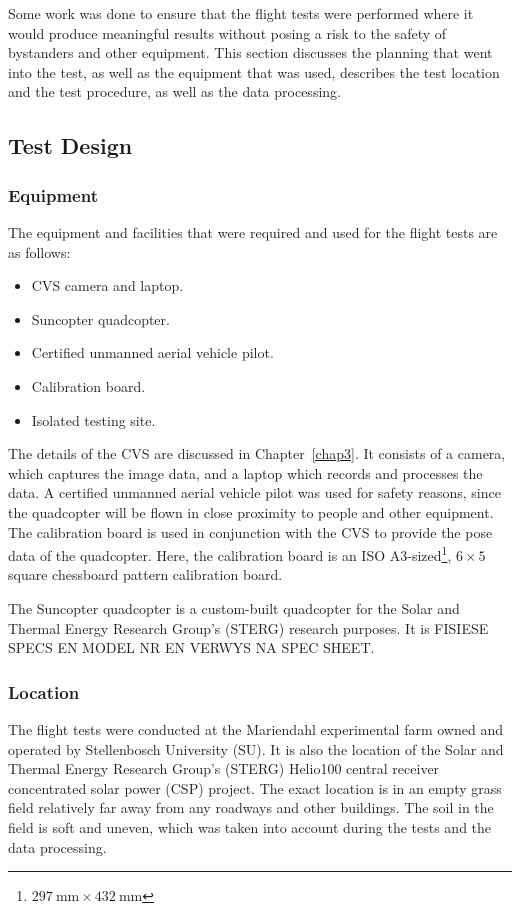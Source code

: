 Some work was done to ensure that the flight tests were performed where it would produce meaningful results without posing a risk to the safety of bystanders and other equipment. This section discusses the planning that went into the test, as well as the equipment that was used, describes the test location and the test procedure, as well as the data processing.  

\subsection{Test Design}

\subsubsection{Equipment}

The equipment and facilities that were required and used for the flight tests are as follows:

\begin{itemize}
    \item CVS camera and laptop.
    \item Suncopter quadcopter.
    \item Certified unmanned aerial vehicle pilot.
    \item Calibration board.
    \item Isolated testing site. 
\end{itemize}

The details of the CVS are discussed in Chapter~\ref{chap3}. It consists of a camera, which captures the image data, and a laptop which records and processes the data. A certified unmanned aerial vehicle pilot was used for safety reasons, since the quadcopter will be flown in close proximity to people and other equipment. The calibration board is used in conjunction with the CVS to provide the pose data of the quadcopter. Here, the calibration board is an ISO A3-sized\footnote{$\SI{297}{\mm}\times\SI{432}{\mm}$}, $6\times5$ square chessboard pattern calibration board. 

The Suncopter quadcopter is a custom-built quadcopter for the Solar and Thermal Energy Research Group's (STERG) research purposes. It is FISIESE SPECS EN MODEL NR EN VERWYS NA SPEC SHEET\@.

\subsubsection{Location}

The flight tests were conducted at the Mariendahl experimental farm owned and operated by Stellenbosch University (SU). It is also the location of the Solar and Thermal Energy Research Group's (STERG) Helio100 central receiver concentrated solar power (CSP) project. The exact location is in an empty grass field relatively far away from any roadways and other buildings. The soil in the field is soft and uneven, which was taken into account during the tests and the data processing. 

